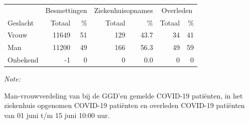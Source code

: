 \documentclass[
  english,
  man,floatsintext]{apa6}
\begin{document}
\begin{table}
\centering\begingroup\fontsize{11}{13}\selectfont

\begin{threeparttable}
\begin{tabular}{lrrrrrr}
\toprule
\multicolumn{1}{c}{ } & \multicolumn{2}{c}{Besmettingen} & \multicolumn{2}{c}{Ziekenhuisopnames} & \multicolumn{2}{c}{Overleden} \\
\cmidrule(l{3pt}r{3pt}){2-3} \cmidrule(l{3pt}r{3pt}){4-5} \cmidrule(l{3pt}r{3pt}){6-7}
Geslacht & Totaal & \% & Totaal & \% & Totaal & \%\\
\midrule
Vrouw & 11649 & 51 & 129 & 43.7 & 34 & 41\\
Man & 11200 & 49 & 166 & 56.3 & 49 & 59\\
Onbekend & -1 & 0 & 0 & 0.0 & 0 & 0\\
\bottomrule
\end{tabular}
\begin{tablenotes}
\item \textit{Note: } 
\item Man-vrouwverdeling van bij de GGD’en gemelde COVID-19 patiënten, in het ziekenhuis opgenomen COVID-19 patiënten en overleden COVID-19 patiënten van 01 juni t/m 15 juni 10:00 uur.
\end{tablenotes}
\end{threeparttable}
\endgroup{}
\end{table}
\newpage
\end{document}
